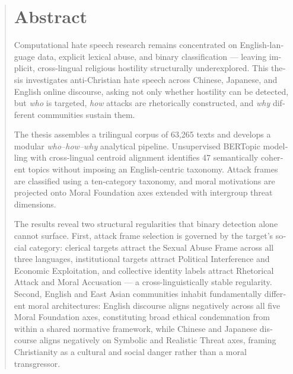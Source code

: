 \documentclass[../CLthesis.tex]{subfiles}
\begin{document}

\begin{abstract}

    \begin{otherlanguage}{english}%

        \section*{Abstract}
        Computational hate speech research remains concentrated on English-language data, explicit lexical abuse, and binary classification --- leaving implicit, cross-lingual religious hostility structurally underexplored. This thesis investigates anti-Christian hate speech across Chinese, Japanese, and English online discourse, asking not only whether hostility can be detected, but \emph{who} is targeted, \emph{how} attacks are rhetorically constructed, and \emph{why} different communities sustain them.

        The thesis assembles a trilingual corpus of 63,265 texts and develops a modular \emph{who--how--why} analytical pipeline. Unsupervised BERTopic modelling with cross-lingual centroid alignment identifies 47 semantically coherent topics without imposing an English-centric taxonomy. Attack frames are classified using a ten-category taxonomy, and moral motivations are projected onto Moral Foundation axes extended with intergroup threat dimensions.

        The results reveal two structural regularities that binary detection alone cannot surface. First, attack frame selection is governed by the target's social category: clerical targets attract the Sexual Abuse Frame across all three languages, institutional targets attract Political Interference and Economic Exploitation, and collective identity labels attract Rhetorical Attack and Moral Accusation --- a cross-linguistically stable regularity. Second, English and East Asian communities inhabit fundamentally different moral architectures: English discourse aligns negatively across all five Moral Foundation axes, constituting broad ethical condemnation from within a shared normative framework, while Chinese and Japanese discourse aligns negatively on Symbolic and Realistic Threat axes, framing Christianity as a cultural and social danger rather than a moral transgressor.


\end{otherlanguage}
\end{abstract}
\end{document}
